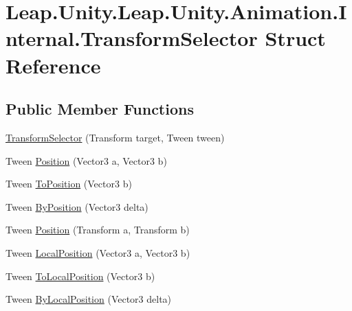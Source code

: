 \hypertarget{struct_leap_1_1_unity_1_1_leap_1_1_unity_1_1_animation_1_1_internal_1_1_transform_selector}{}\section{Leap.\+Unity.\+Leap.\+Unity.\+Animation.\+Internal.\+Transform\+Selector Struct Reference}
\label{struct_leap_1_1_unity_1_1_leap_1_1_unity_1_1_animation_1_1_internal_1_1_transform_selector}
\subsection*{Public Member Functions}
\begin{DoxyCompactItemize}
\item 
\mbox{\hyperlink{struct_leap_1_1_unity_1_1_leap_1_1_unity_1_1_animation_1_1_internal_1_1_transform_selector_af004cc1165616369a41a8af27b0bb71e}{Transform\+Selector}} (Transform target, Tween tween)
\item 
Tween \mbox{\hyperlink{struct_leap_1_1_unity_1_1_leap_1_1_unity_1_1_animation_1_1_internal_1_1_transform_selector_a423b5b8d0bd97e2e3524914cf33b7711}{Position}} (Vector3 a, Vector3 b)
\item 
Tween \mbox{\hyperlink{struct_leap_1_1_unity_1_1_leap_1_1_unity_1_1_animation_1_1_internal_1_1_transform_selector_ae25c532c31f47365c2e11845cb3949be}{To\+Position}} (Vector3 b)
\item 
Tween \mbox{\hyperlink{struct_leap_1_1_unity_1_1_leap_1_1_unity_1_1_animation_1_1_internal_1_1_transform_selector_aa2264ae25a234a675fb2acdf0cf2bd13}{By\+Position}} (Vector3 delta)
\item 
Tween \mbox{\hyperlink{struct_leap_1_1_unity_1_1_leap_1_1_unity_1_1_animation_1_1_internal_1_1_transform_selector_a0d20e79b487476608bd81202d6294653}{Position}} (Transform a, Transform b)
\item 
Tween \mbox{\hyperlink{struct_leap_1_1_unity_1_1_leap_1_1_unity_1_1_animation_1_1_internal_1_1_transform_selector_abb435c49672d4d1b934a6be8f7783acf}{Local\+Position}} (Vector3 a, Vector3 b)
\item 
Tween \mbox{\hyperlink{struct_leap_1_1_unity_1_1_leap_1_1_unity_1_1_animation_1_1_internal_1_1_transform_selector_a7f9074f159aadb0fbe01a4f91d77a8d5}{To\+Local\+Position}} (Vector3 b)
\item 
Tween \mbox{\hyperlink{struct_leap_1_1_unity_1_1_leap_1_1_unity_1_1_animation_1_1_internal_1_1_transform_selector_aba4dcaa0cd568959b08ff944b9020ab0}{By\+Local\+Position}} (Vector3 delta)

\end{DoxyCompactItemize}

